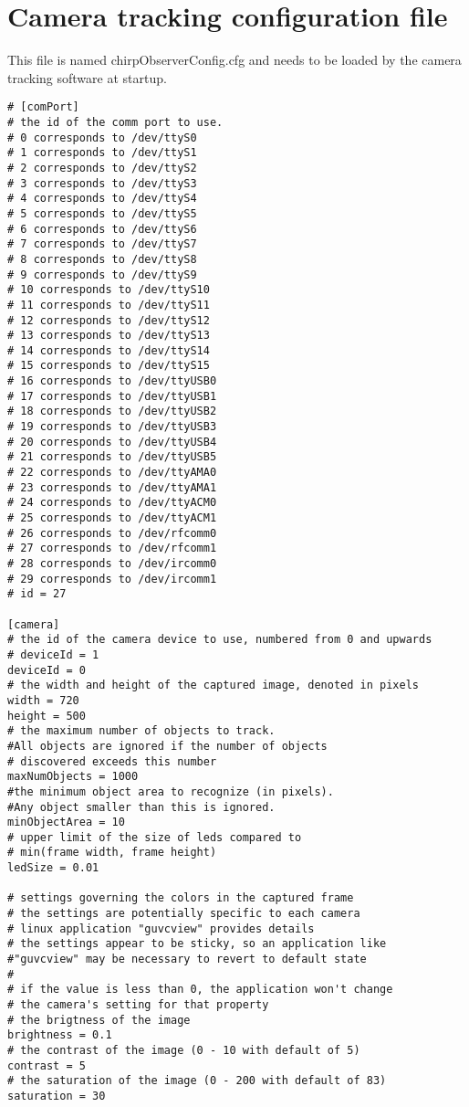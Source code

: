 \chapter{Camera tracking configuration file}
\label{app:opencvcfg}
This file is named chirpObserverConfig.cfg and needs to be loaded by the camera tracking software at startup.
\begin{lstlisting}
# [comPort]
# the id of the comm port to use. 
# 0 corresponds to /dev/ttyS0 
# 1 corresponds to /dev/ttyS1
# 2 corresponds to /dev/ttyS2
# 3 corresponds to /dev/ttyS3
# 4 corresponds to /dev/ttyS4
# 5 corresponds to /dev/ttyS5
# 6 corresponds to /dev/ttyS6
# 7 corresponds to /dev/ttyS7
# 8 corresponds to /dev/ttyS8
# 9 corresponds to /dev/ttyS9
# 10 corresponds to /dev/ttyS10
# 11 corresponds to /dev/ttyS11
# 12 corresponds to /dev/ttyS12
# 13 corresponds to /dev/ttyS13
# 14 corresponds to /dev/ttyS14
# 15 corresponds to /dev/ttyS15
# 16 corresponds to /dev/ttyUSB0
# 17 corresponds to /dev/ttyUSB1
# 18 corresponds to /dev/ttyUSB2
# 19 corresponds to /dev/ttyUSB3
# 20 corresponds to /dev/ttyUSB4
# 21 corresponds to /dev/ttyUSB5
# 22 corresponds to /dev/ttyAMA0
# 23 corresponds to /dev/ttyAMA1
# 24 corresponds to /dev/ttyACM0
# 25 corresponds to /dev/ttyACM1
# 26 corresponds to /dev/rfcomm0
# 27 corresponds to /dev/rfcomm1
# 28 corresponds to /dev/ircomm0
# 29 corresponds to /dev/ircomm1
# id = 27

[camera]
# the id of the camera device to use, numbered from 0 and upwards
# deviceId = 1
deviceId = 0
# the width and height of the captured image, denoted in pixels
width = 720	
height = 500
# the maximum number of objects to track. 
#All objects are ignored if the number of objects
# discovered exceeds this number
maxNumObjects = 1000
#the minimum object area to recognize (in pixels). 
#Any object smaller than this is ignored.
minObjectArea = 10
# upper limit of the size of leds compared to 
# min(frame width, frame height)
ledSize = 0.01

# settings governing the colors in the captured frame
# the settings are potentially specific to each camera
# linux application "guvcview" provides details
# the settings appear to be sticky, so an application like 
#"guvcview" may be necessary to revert to default state
#
# if the value is less than 0, the application won't change
# the camera's setting for that property
# the brigtness of the image
brightness = 0.1
# the contrast of the image (0 - 10 with default of 5)
contrast = 5
# the saturation of the image (0 - 200 with default of 83)
saturation = 30


\end{lstlisting}
